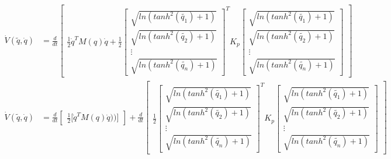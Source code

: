 \documentclass[12pt]{article}
\begin{document}
\begin{enumerate}
    \begin{equation}
        \begin{split}
            \dot{V}(\tilde{q},\dot{q})&=\frac{d}{dt}\begin{bmatrix}
                \frac{1}{2}\dot{q}^TM(q)\dot{q}+\frac{1}{2}
            \begin{bmatrix}
                \sqrt{ln(tanh^2(\tilde{q_1})+1)}\\
                \sqrt{ln(tanh^2(\tilde{q_2})+1)}\\
                \vdots\\
                \sqrt{ln(tanh^2(\tilde{q_n})+1)}
            \end{bmatrix}^T
            K_p
            \begin{bmatrix}
                \sqrt{ln(tanh^2(\tilde{q_1})+1)}\\
                \sqrt{ln(tanh^2(\tilde{q_2})+1)}\\
                \vdots\\
                \sqrt{ln(tanh^2(\tilde{q_n})+1)}
            \end{bmatrix}
            \end{bmatrix}\\
            \dot{V}(\tilde{q},\dot{q})&=
            \frac{d}{dt}\begin{bmatrix}
                \frac{1}{2}\lbrack\dot{q}^TM(q)\dot{q}))\rbrack
            \end{bmatrix}
            +\frac{d}{dt}
            \begin{bmatrix}
                \frac{1}{2}
            \begin{bmatrix}
                \sqrt{ln(tanh^2(\tilde{q_1})+1)}\\
                \sqrt{ln(tanh^2(\tilde{q_2})+1)}\\
                \vdots\\
                \sqrt{ln(tanh^2(\tilde{q_n})+1)}
            \end{bmatrix}^T
            K_p
            \begin{bmatrix}
                \sqrt{ln(tanh^2(\tilde{q_1})+1)}\\
                \sqrt{ln(tanh^2(\tilde{q_2})+1)}\\
                \vdots\\
                \sqrt{ln(tanh^2(\tilde{q_n})+1)}
            \end{bmatrix}
            \end{bmatrix}\\

\end{split}
\end{equation}
\end{enumerate}
\end{document}

